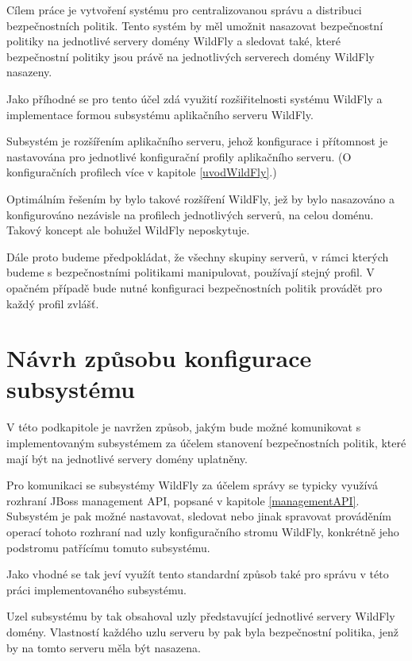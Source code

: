 Cílem práce je vytvoření systému pro centralizovanou správu a distribuci bezpečnostních politik.
Tento systém by měl umožnit nasazovat bezpečnostní politiky na jednotlivé servery domény WildFly a sledovat také,
které bezpečnostní politiky jsou právě na jednotlivých serverech domény WildFly nasazeny.

Jako příhodné se pro tento účel zdá využití rozšiřitelnosti systému WildFly a implementace formou subsystému aplikačního serveru WildFly.

Subsystém je rozšířením aplikačního serveru, jehož konfigurace i přítomnost je nastavována pro jednotlivé konfigurační profily aplikačního serveru.
(O konfiguračních profilech více v kapitole \ref{uvodWildFly}.)

Optimálním řešením by bylo takové rozšíření WildFly, jež by bylo nasazováno a konfigurováno nezávisle na profilech jednotlivých serverů, na celou doménu.
Takový koncept ale bohužel WildFly neposkytuje.

Dále proto budeme předpokládat, že všechny skupiny serverů, v rámci kterých budeme s bezpečnostními politikami manipulovat, používají stejný profil.
V opačném případě bude nutné konfiguraci bezpečnostních politik provádět pro každý profil zvlášť.

\section{Návrh způsobu konfigurace subsystému} \label{zpusobNastaveniJBoss}

V této podkapitole je navržen způsob, jakým bude možné komunikovat s implementovaným subsystémem za účelem stanovení bezpečnostních politik, které mají být na jednotlivé servery domény uplatněny.

Pro komunikaci se subsystémy WildFly za účelem správy se typicky využívá rozhraní JBoss management API, popsané v kapitole \ref{managementAPI}.
Subsystém je pak možné nastavovat, sledovat nebo jinak spravovat prováděním operací tohoto rozhraní nad uzly konfiguračního stromu WildFly,
konkrétně jeho podstromu patřícímu tomuto subsystému.
\cite{jbossDetypedManagement}

Jako vhodné se tak jeví využít tento standardní způsob také pro správu v této práci implementovaného subsystému.

Uzel subsystému by tak obsahoval uzly představující jednotlivé servery WildFly domény.
Vlastností každého uzlu serveru by pak byla bezpečnostní politika, jenž by na tomto serveru měla být nasazena.

